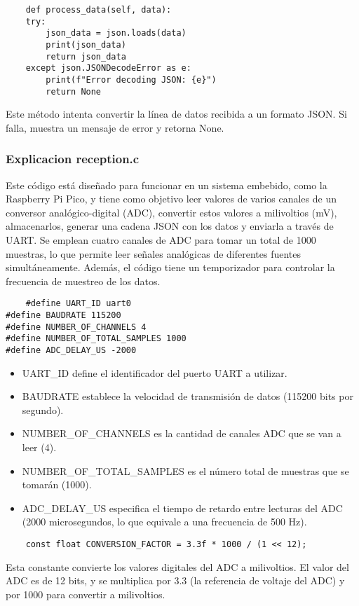 \documentclass{article}
\begin{document}
\begin{lstlisting}
    def process_data(self, data):
    try:
        json_data = json.loads(data)
        print(json_data)
        return json_data
    except json.JSONDecodeError as e:
        print(f"Error decoding JSON: {e}")
        return None
\end{lstlisting}
Este método intenta convertir la línea de datos recibida a un formato JSON. Si falla, muestra un mensaje de error y retorna None.

\subsubsection{Explicacion reception.c}
Este código está diseñado para funcionar en un sistema embebido, como la Raspberry Pi Pico, y tiene como objetivo leer valores de varios canales de un conversor analógico-digital (ADC), convertir estos valores a milivoltios (mV), almacenarlos, generar una cadena JSON con los datos y enviarla a través de UART. Se emplean cuatro canales de ADC para tomar un total de 1000 muestras, lo que permite leer señales analógicas de diferentes fuentes simultáneamente. Además, el código tiene un temporizador para controlar la frecuencia de muestreo de los datos.

\begin{lstlisting}
    #define UART_ID uart0
#define BAUDRATE 115200
#define NUMBER_OF_CHANNELS 4
#define NUMBER_OF_TOTAL_SAMPLES 1000
#define ADC_DELAY_US -2000
\end{lstlisting}
\begin{itemize}
    \item UART\_ID define el identificador del puerto UART a utilizar.
    \item BAUDRATE establece la velocidad de transmisión de datos (115200 bits por segundo).
    \item NUMBER\_OF\_CHANNELS es la cantidad de canales ADC que se van a leer (4).
    \item NUMBER\_OF\_TOTAL\_SAMPLES es el número total de muestras que se tomarán (1000).
    \item ADC\_DELAY\_US especifica el tiempo de retardo entre lecturas del ADC (2000 microsegundos, lo que equivale a una frecuencia de 500 Hz).
\end{itemize}

\begin{lstlisting}
    const float CONVERSION_FACTOR = 3.3f * 1000 / (1 << 12);
\end{lstlisting}
Esta constante convierte los valores digitales del ADC a milivoltios. El valor del ADC es de 12 bits, y se multiplica por 3.3 (la referencia de voltaje del ADC) y por 1000 para convertir a milivoltios.
\end{document}
